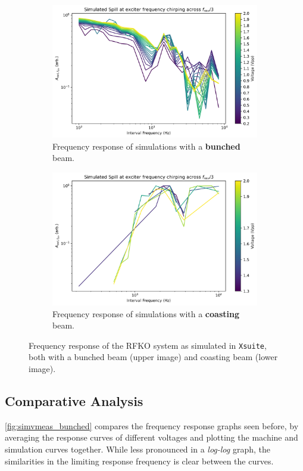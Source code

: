 \documentclass[11pt]{report}
\begin{document}
\begin{figure}[h]
  \centering
  \begin{subfigure}[b]{0.9\linewidth}
    \includegraphics*[width=\linewidth]{sim_rf_on.png}
    \caption{Frequency response of simulations with a \textbf{bunched} beam.}\label{sim_rf_on}
  \end{subfigure}
  \begin{subfigure}[b]{0.9\linewidth}
    \includegraphics*[width=\linewidth]{sim_rf_off.png}
    \caption{Frequency response of simulations with a \textbf{coasting} beam.}\label{sim_rf_off}
  \end{subfigure}
  \cprotect\caption{Frequency response of the RFKO system as simulated in \verb|Xsuite|, both with a bunched beam (upper image) and coasting beam (lower image).}\label{fig:freq_response_sim}
\end{figure}

\subsection{Comparative Analysis}\label{results:freq_response}
\autoref{fig:simvmeas_bunched} compares the frequency response graphs seen before, by averaging the response curves of different voltages and plotting the machine and simulation curves together. While less pronounced in a \textit{log-log} graph, the similarities in the limiting response frequency is clear between the curves. 
\end{document}
